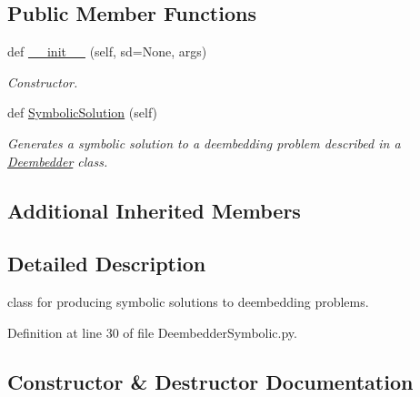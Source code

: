 \subsection*{Public Member Functions}
\begin{DoxyCompactItemize}
\item 
def \hyperlink{classSignalIntegrity_1_1SystemDescriptions_1_1DeembedderSymbolic_1_1DeembedderSymbolic_a72fa31992e716f60779f561f6cdbb4ce}{\+\_\+\+\_\+init\+\_\+\+\_\+} (self, sd=None, args)
\begin{DoxyCompactList}\small\item\em Constructor. \end{DoxyCompactList}\item 
def \hyperlink{classSignalIntegrity_1_1SystemDescriptions_1_1DeembedderSymbolic_1_1DeembedderSymbolic_a10ef812418fff67deff1540435a9698c}{Symbolic\+Solution} (self)
\begin{DoxyCompactList}\small\item\em Generates a symbolic solution to a deembedding problem described in a \hyperlink{namespaceSignalIntegrity_1_1SystemDescriptions_1_1Deembedder}{Deembedder} class. \end{DoxyCompactList}\end{DoxyCompactItemize}
\subsection*{Additional Inherited Members}


\subsection{Detailed Description}
class for producing symbolic solutions to deembedding problems. 

Definition at line 30 of file Deembedder\+Symbolic.\+py.



\subsection{Constructor \& Destructor Documentation}
\mbox{\label{classSignalIntegrity_1_1SystemDescriptions_1_1DeembedderSymbolic_1_1DeembedderSymbolic_a72fa31992e716f60779f561f6cdbb4ce}} 
